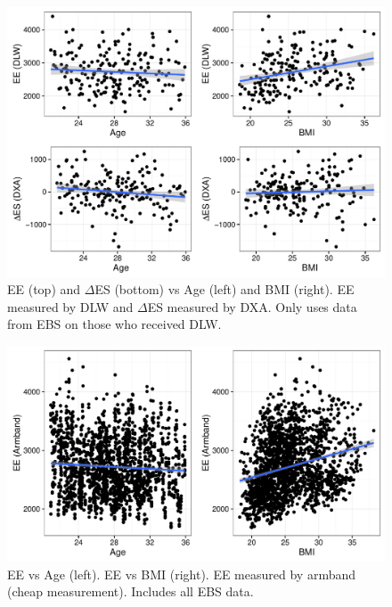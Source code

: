 \documentclass[11pt]{article}\usepackage[]{graphicx}\usepackage[]{color}
\makeatletter
\def\maxwidth{ %
  \ifdim\Gin@nat@width>\linewidth
    \linewidth
  \else
    \Gin@nat@width
  \fi
}
\newenvironment{knitrout}{}{} %
\makeatother
\begin{document}
\begin{knitrout}
\color{fgcolor}\begin{figure}

{\centering \includegraphics[width=\maxwidth]{figure/ebsdiagcovariates-1} 

}

\caption[EE (top) and ]{EE (top) and $\Delta$ES (bottom) vs Age (left) and BMI (right). EE measured by DLW and $\Delta$ES measured by DXA. Only uses data from EBS on those who received DLW. }\label{fig:ebsdiagcovariates}
\end{figure}


\end{knitrout}


\begin{knitrout}
\color{fgcolor}\begin{figure}

{\centering \includegraphics[width=\maxwidth]{figure/ebsdiagcovariates2-1} 

}

\caption[EE vs Age (left)]{EE vs Age (left). EE vs BMI (right). EE measured by armband (cheap measurement). Includes all EBS data.}\label{fig:ebsdiagcovariates2}
\end{figure}


\end{knitrout}
\end{document}
